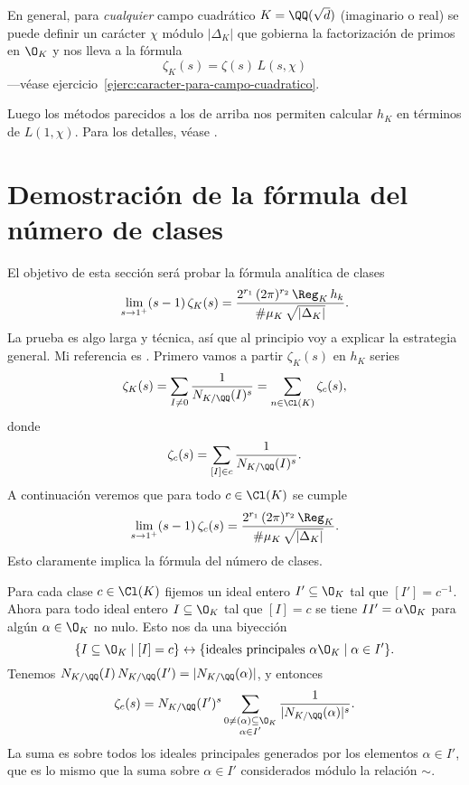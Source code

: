 \begin{comentario}
  En general, para \emph{cualquier} campo cuadrático $K = \QQ (\sqrt{d})$
  (imaginario o real) se puede definir un carácter $\chi$ módulo $|\Delta_K|$
  que gobierna la factorización de primos en $\O_K$ y nos lleva a la fórmula
  $$\zeta_K (s) = \zeta (s) \, L (s,\chi)$$
  ---véase ejercicio~\ref{ejerc:caracter-para-campo-cuadratico}.

  Luego los métodos parecidos a los de arriba nos permiten calcular $h_K$
  en términos de $L (1,\chi)$. Para los detalles, véase
  \cite[Chapter~5]{Borevich-Shafarevich}.
\end{comentario}


\section{Demostración de la fórmula del número de clases}

El objetivo de esta sección será probar la fórmula analítica de clases
\[ \lim_{s \to 1^+} (s - 1)\,\zeta_K (s) =
   \frac{2^{r_1}\,(2\pi)^{r_2}\,\Reg_K\,h_k}{\#\mu_K\,\sqrt{|\Delta_K|}}. \]
La prueba es algo larga y técnica, así que al principio voy a explicar
la estrategia general. Mi referencia es \cite{Borevich-Shafarevich}.
Primero vamos a partir $\zeta_K (s)$ en $h_K$ series
$$\zeta_K (s) = \sum_{I\ne 0} \frac{1}{N_{K/\QQ} (I)^s} = \sum_{n\in \Cl (K)} \zeta_c (s),$$
donde
$$\zeta_c (s) = \sum_{[I] \in c} \frac{1}{N_{K/\QQ} (I)^s}.$$
A continuación veremos que para todo $c \in \Cl (K)$ se cumple
\[ \lim_{s \to 1^+} (s - 1)\,\zeta_c (s) =
   \frac{2^{r_1}\,(2\pi)^{r_2}\,\Reg_K}{\#\mu_K\,\sqrt{|\Delta_K|}}. \]
Esto claramente implica la fórmula del número de clases.

\vspace{1em}

Para cada clase $c \in \Cl (K)$ fijemos un ideal entero $I' \subseteq \O_K$
tal que $[I'] = c^{-1}$. Ahora para todo ideal entero $I \subseteq \O_K$ tal que
$[I] = c$ se tiene $I I' = \alpha \O_K$ para algún $\alpha \in \O_K$ no nulo.
Esto nos da una biyección
\[ \{ I \subseteq \O_K \mid [I] = c \} \leftrightarrow
\{ \text{ideales principales } \alpha\O_K \mid \alpha \in I' \}. \]
Tenemos $N_{K/\QQ} (I) \, N_{K/\QQ} (I') = |N_{K/\QQ} (\alpha)|$, y entonces
$$\zeta_c (s) = N_{K/\QQ} (I')^s \sum_{\substack{0 \ne (\alpha) \subseteq \O_K \\ \alpha \in I'}} \frac{1}{|N_{K/\QQ} (\alpha)|^s}.$$
La suma es sobre todos los ideales principales generados por los elementos
$\alpha \in I'$, que es lo mismo que la suma sobre $\alpha \in I'$ considerados
módulo la relación $\sim$.

